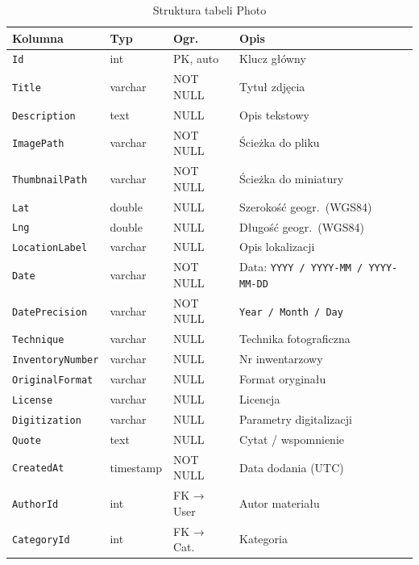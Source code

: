 \documentclass[12pt, a4paper]{article}
\begin{document}
\begin{table}[H]
  \centering
  \caption{Struktura tabeli Photo}
  \begin{tabular}{@{}L{3.8cm}L{2.2cm}L{2.3cm}L{5cm}@{}}
    \toprule
    \textbf{Kolumna} & \textbf{Typ} & \textbf{Ogr.} & \textbf{Opis} \\
    \midrule
    \texttt{Id}              & int       & PK, auto  & Klucz główny \\
    \texttt{Title}           & varchar   & NOT NULL  & Tytuł zdjęcia \\
    \texttt{Description}     & text      & NULL      & Opis tekstowy \\
    \texttt{ImagePath}       & varchar   & NOT NULL  & Ścieżka do pliku \\
    \texttt{ThumbnailPath}   & varchar   & NOT NULL  & Ścieżka do miniatury \\
    \texttt{Lat}             & double    & NULL      & Szerokość geogr.\ (WGS84) \\
    \texttt{Lng}             & double    & NULL      & Długość geogr.\ (WGS84) \\
    \texttt{LocationLabel}   & varchar   & NULL      & Opis lokalizacji \\
    \texttt{Date}            & varchar   & NOT NULL  & Data: \texttt{YYYY / YYYY-MM / YYYY-MM-DD} \\
    \texttt{DatePrecision}   & varchar   & NOT NULL  & \texttt{Year / Month / Day} \\
    \texttt{Technique}       & varchar   & NULL      & Technika fotograficzna \\
    \texttt{InventoryNumber} & varchar   & NULL      & Nr inwentarzowy \\
    \texttt{OriginalFormat}  & varchar   & NULL      & Format oryginału \\
    \texttt{License}         & varchar   & NULL      & Licencja \\
    \texttt{Digitization}    & varchar   & NULL      & Parametry digitalizacji \\
    \texttt{Quote}           & text      & NULL      & Cytat / wspomnienie \\
    \texttt{CreatedAt}       & timestamp & NOT NULL  & Data dodania (UTC) \\
    \texttt{AuthorId}        & int       & FK → User & Autor materiału \\
    \texttt{CategoryId}      & int       & FK → Cat. & Kategoria \\
    \bottomrule
  \end{tabular}
\end{table}
\end{document}
